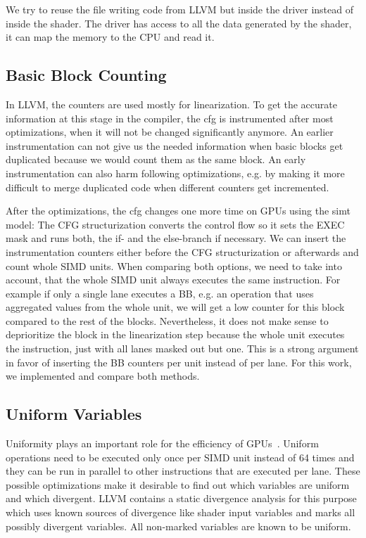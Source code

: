 We try to reuse the file writing code from LLVM but inside the driver instead of inside the shader.
The driver has access to all the data generated by the shader, it can map the memory to the CPU and read it.

\subsection{Basic Block Counting}
\label{sub:design_counters}
In LLVM, the counters are used mostly for linearization. To get the accurate information at this stage in the compiler, the \gls{cfg} is instrumented after most optimizations, when it will not be changed significantly anymore. An earlier instrumentation can not give us the needed information when basic blocks get duplicated because we would count them as the same block. An early instrumentation can also harm following optimizations, e.g. by making it more difficult to merge duplicated code when different counters get incremented.

After the optimizations, the \gls{cfg} changes one more time on GPUs using the \gls{simt} model: The CFG structurization converts the control flow so it sets the EXEC mask and runs both, the if- and the else-branch if necessary. We can insert the instrumentation counters either before the CFG structurization or afterwards and count whole SIMD units. When comparing both options, we need to take into account, that the whole SIMD unit always executes the same instruction. For example if only a single lane executes a BB, e.g. an operation that uses aggregated values from the whole unit, we will get a low counter for this block compared to the rest of the blocks. Nevertheless, it does not make sense to deprioritize the block in the linearization step because the whole unit executes the instruction, just with all lanes masked out but one. This is a strong argument in favor of inserting the BB counters per unit instead of per lane. For this work, we implemented and compare both methods.

\subsection{Uniform Variables}
\label{sub:uniformity}
Uniformity plays an important role for the efficiency of GPUs~\cite{Chen2016}. Uniform operations need to be executed only once per SIMD unit instead of 64 times and they can be run in parallel to other instructions that are executed per lane. These possible optimizations make it desirable to find out which variables are uniform and which divergent. LLVM contains a static divergence analysis for this purpose which uses known sources of divergence like shader input variables and marks all possibly divergent variables. All non-marked variables are known to be uniform.

